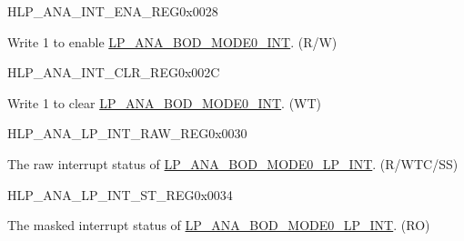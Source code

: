 \begin{register}{H}{LP\_ANA\_INT\_ENA\_REG}{0x0028}\label{regdesc:LPANAINTENAREG}
%
%
\regnewline%
\begin{regdesc}\begin{reglist}
\label{fielddesc:LPANABODMODE0INTENA}\item [LP\_ANA\_BOD\_MODE0\_INT\_ENA] Write 1 to enable \hyperref[int:LPANABODMODE0INT]{LP\_ANA\_BOD\_MODE0\_INT}. (R/W)
\end{reglist}\end{regdesc}
\end{register}

\begin{register}{H}{LP\_ANA\_INT\_CLR\_REG}{0x002C}\label{regdesc:LPANAINTCLRREG}
%
%
\regnewline%
\begin{regdesc}\begin{reglist}
\label{fielddesc:LPANABODMODE0INTCLR}\item [LP\_ANA\_BOD\_MODE0\_INT\_CLR] Write 1 to clear \hyperref[int:LPANABODMODE0INT]{LP\_ANA\_BOD\_MODE0\_INT}. (WT)
\end{reglist}\end{regdesc}
\end{register}

\begin{register}{H}{LP\_ANA\_LP\_INT\_RAW\_REG}{0x0030}\label{regdesc:LPANALPINTRAWREG}
%
%
\regnewline%
\begin{regdesc}\begin{reglist}
\label{fielddesc:LPANABODMODE0LPINTRAW}\item [LP\_ANA\_BOD\_MODE0\_LP\_INT\_RAW] The raw interrupt status of \hyperref[int:LPANABODMODE0LPINT]{LP\_ANA\_BOD\_MODE0\_LP\_INT}. (R/WTC/SS)
\end{reglist}\end{regdesc}
\end{register}

\begin{register}{H}{LP\_ANA\_LP\_INT\_ST\_REG}{0x0034}\label{regdesc:LPANALPINTSTREG}
%
%
\regnewline%
\begin{regdesc}\begin{reglist}
\label{fielddesc:LPANABODMODE0LPINTST}\item [LP\_ANA\_BOD\_MODE0\_LP\_INT\_ST] The masked interrupt status of \hyperref[int:LPANABODMODE0LPINT]{LP\_ANA\_BOD\_MODE0\_LP\_INT}. (RO)
\end{reglist}\end{regdesc}
\end{register}

